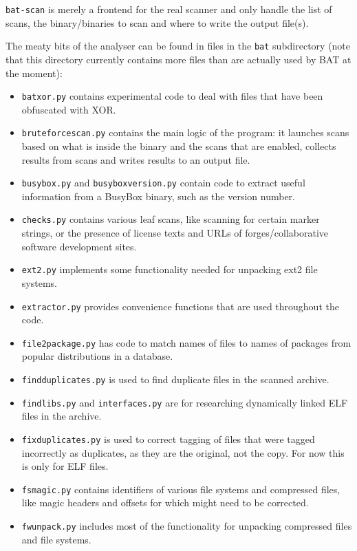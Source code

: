 \documentclass[10pt,a4paper]{article}
\begin{document}
\texttt{bat-scan} is merely a frontend for the real scanner and only handle
the list of scans, the binary/binaries to scan and where to write the output
file(s).

The meaty bits of the analyser can be found in files in the \texttt{bat}
subdirectory (note that this directory currently contains more files than are
actually used by BAT at the moment):

\begin{itemize}
\item \texttt{batxor.py} contains experimental code to deal with files that
have been obfuscated with XOR.
\item \texttt{bruteforcescan.py} contains the main logic of the program: it
launches scans based on what is inside the binary and the scans that are
enabled, collects results from scans and writes results to an output file.
\item \texttt{busybox.py} and \texttt{busyboxversion.py} contain code to
extract useful information from a BusyBox binary, such as the version number.
\item \texttt{checks.py} contains various leaf scans, like scanning for certain
marker strings, or the presence of license texts and URLs of
forges/collaborative software development sites.
\item \texttt{ext2.py} implements some functionality needed for unpacking ext2
file systems.
\item \texttt{extractor.py} provides convenience functions that are used
throughout the code.
\item \texttt{file2package.py} has code to match names of files to names of
packages from popular distributions in a database.
\item \texttt{findduplicates.py} is used to find duplicate files in the scanned
archive.
\item \texttt{findlibs.py} and \texttt{interfaces.py} are for researching
dynamically linked ELF files in the archive.
\item \texttt{fixduplicates.py} is used to correct tagging of files that were
tagged incorrectly as duplicates, as they are the original, not the copy. For
now this is only for ELF files.
\item \texttt{fsmagic.py} contains identifiers of various file systems and
compressed files, like magic headers and offsets for which might need to be
corrected.
\item \texttt{fwunpack.py} includes most of the functionality for unpacking
compressed files and file systems.

\end{itemize}
\end{document}
